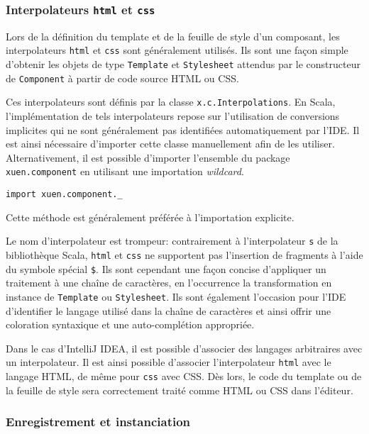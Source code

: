 \subsubsection{Interpolateurs \texttt{html} et \texttt{css}}

Lors de la définition du template et de la feuille de style d'un composant, les interpolateurs \texttt{html} et \texttt{css} sont généralement utilisés. Ils sont une façon simple d'obtenir les objets de type \texttt{Template} et \texttt{Stylesheet} attendus par le constructeur de \texttt{Component} à partir de code source HTML ou CSS.

Ces interpolateurs sont définis par la classe \texttt{x.c.Interpolations}. En Scala, l'implémentation de tels interpolateurs repose sur l'utilisation de conversions implicites qui ne sont généralement pas identifiées automatiquement par l'IDE. Il est ainsi nécessaire d'importer cette classe manuellement afin de les utiliser. Alternativement, il est possible d'importer l'ensemble du package \texttt{xuen.component} en utilisant une importation \emph{wildcard}.
\begin{lstlisting}
import xuen.component._
\end{lstlisting}
Cette méthode est généralement préférée à l'importation explicite.

Le nom d'interpolateur est trompeur: contrairement à l'interpolateur \texttt{s} de la bibliothèque Scala, \texttt{html} et \texttt{css} ne supportent pas l'insertion de fragments à l'aide du symbole spécial \texttt{\$}. Ils sont cependant une façon concise d'appliquer un traitement à une chaîne de caractères, en l'occurrence la transformation en instance de \texttt{Template} ou \texttt{Stylesheet}. Ils sont également l'occasion pour l'IDE d'identifier le langage utilisé dans la chaîne de caractères et ainsi offrir une coloration syntaxique et une auto-complétion appropriée.

Dans le cas d'IntelliJ IDEA, il est possible d'associer des langages arbitraires avec un interpolateur. Il est ainsi possible d'associer l'interpolateur \texttt{html} avec le langage HTML, de même pour \texttt{css} avec CSS. Dès lors, le code du template ou de la feuille de style sera correctement traité comme HTML ou CSS dans l'éditeur.

\subsubsection{Enregistrement et instanciation}

